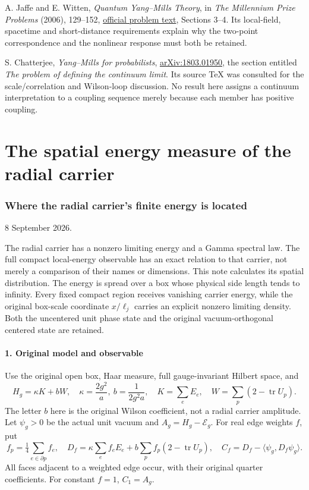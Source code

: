 \documentclass[
  11pt,
]{article}
\begin{document}
A. Jaffe and E. Witten, \emph{Quantum Yang--Mills Theory}, in \emph{The
Millennium Prize Problems} (2006), 129--152,
\href{https://www.claymath.org/wp-content/uploads/2022/06/yangmills.pdf}{official
problem text}, Sections 3--4. Its local-field, spacetime and
short-distance requirements explain why the two-point correspondence and
the nonlinear response must both be retained.

S. Chatterjee, \emph{Yang--Mills for probabilists},
\href{https://arxiv.org/abs/1803.01950}{arXiv:1803.01950}, the section
entitled \emph{The problem of defining the continuum limit}. Its source
TeX was consulted for the scale/correlation and Wilson-loop discussion.
No result here assigns a continuum interpretation to a coupling sequence
merely because each member has positive coupling.

\clearpage
\part{The spatial energy measure of the radial carrier}
\section{Where the radial carrier's finite energy is
located}\label{weak-coupling-part-12-where-the-radial-carriers-finite-energy-is-located}

8 September 2026.

The radial carrier has a nonzero limiting energy and a Gamma spectral
law. The full compact local-energy observable has an exact relation to
that carrier, not merely a comparison of their names or dimensions. This
note calculates its spatial distribution. The energy is spread over a
box whose physical side length tends to infinity. Every fixed compact
region receives vanishing carrier energy, while the original box-scale
coordinate \(x/\ell_j\) carries an explicit nonzero limiting density.
Both the uncentered unit phase state and the original vacuum-orthogonal
centered state are retained.

\subsection{1. Original model and
observable}\label{weak-coupling-part-12-original-model-and-observable}

Use the original open box, Haar measure, full gauge-invariant Hilbert
space, and \[
 H_g=\kappa K+bW,\quad \kappa=\frac{2g^2}{a},\
 b=\frac1{2g^2a},\quad
 K=\sum_eE_e,\quad W=\sum_p(2-\operatorname{tr}U_p).
 \tag{1}
\] The letter \(b\) here is the original Wilson coefficient, not a
radial carrier amplitude. Let \(\psi_g>0\) be the actual unit vacuum and
\(A_g=H_g-\mathcal E_g\). For real edge weights \(f\), put \[
 f_p=\tfrac14\sum_{e\in\partial p}f_e,\quad
 D_f=\kappa\sum_ef_eE_e+b\sum_pf_p(2-\operatorname{tr}U_p),
 \quad C_f=D_f-\langle\psi_g,D_f\psi_g\rangle .
 \tag{2}
\] All faces adjacent to a weighted edge occur, with their original
quarter coefficients. For constant \(f=1\), \(C_1=A_g\).
\end{document}
